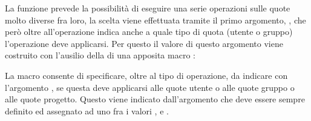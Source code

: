 La funzione prevede la possibilità di eseguire una serie operazioni sulle
quote molto diverse fra loro, la scelta viene effettuata tramite il primo
argomento, , che però oltre all'operazione indica anche a quale
tipo di quota (utente o gruppo) l'operazione deve applicarsi. Per questo il
valore di questo argomento viene costruito con l'ausilio della di una apposita
macro :

{\centering
\vspace{3pt}
\begin{funcbox}{
} 
\end{funcbox}
}

La macro consente di specificare, oltre al tipo di operazione, da indicare con
l'argomento , se questa deve applicarsi alle quote utente o alle
quote gruppo o alle quote progetto. Questo viene indicato dall'argomento
 che deve essere sempre definito ed assegnato ad uno fra i valori
,  e .

